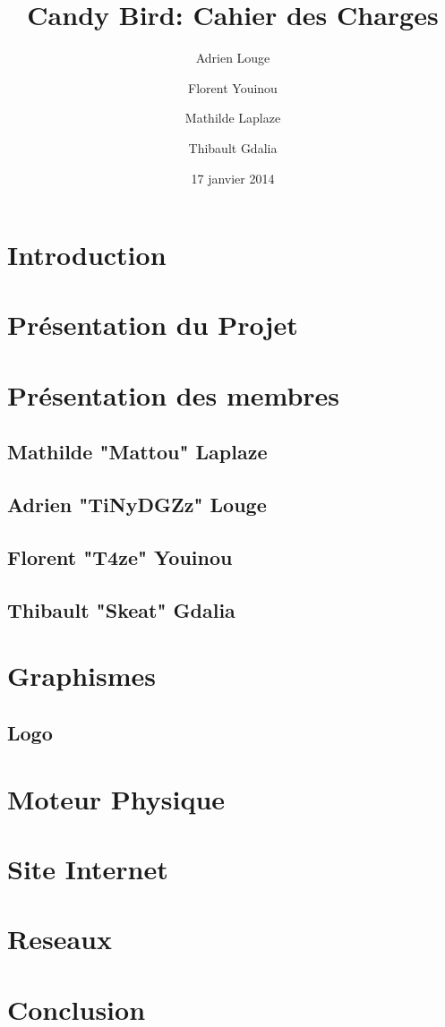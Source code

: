 \documentclass [11pt]{report}
\title {\textbf{ {Candy Bird: Cahier des Charges}}}
\author{Adrien Louge \and Florent Youinou \and Mathilde Laplaze \and Thibault Gdalia}
\date{17 janvier 2014}
\begin{document}
\renewcommand{\baselinestretch}{0.001}
\maketitle
\tableofcontents

\chapter {Introduction}


\chapter {Pr\'esentation du Projet}

\chapter {Pr\'esentation des membres}
	\section {Mathilde "Mattou" Laplaze}
	\section {Adrien "TiNyDGZz" Louge}
	\section {Florent "T4ze" Youinou}
	\section {Thibault "Skeat" Gdalia}
		
	

\chapter {Graphismes}
	\section {Logo}
 
\chapter {Moteur Physique}

\chapter {Site Internet}

\chapter {Reseaux}

\chapter {Conclusion}
\end{document}
